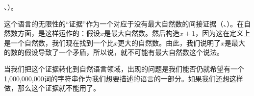 \citealp*[]{HNG2005a}、\citealp[]{KS2008a-u}）。

这个语言的无限性的“证据”作为一个对应于没有最大自然数的间接证据（\citealp[--106]{Bierwisch66a}、\citealp[]{Pinker94a}）。在自然数方面，是这样运作的：假设$x$是最大自然数。然后构造$x + 1$，因为这在定义上是一个自然数，我们现在找到一个比$x$更大的自然数。由此，我们说明了$x$是最大的数的假设导致了一个矛盾，所以说，就不可能有最大自然数这个说法。

当我们把这个证据转化到自然语言领域，出现的问题是我们能否仍就希望有一个1,000,000,000词的字符串作为我们想要描述的语言的一部分。如果我们还想这样做，那么这个证据就不能用了。

